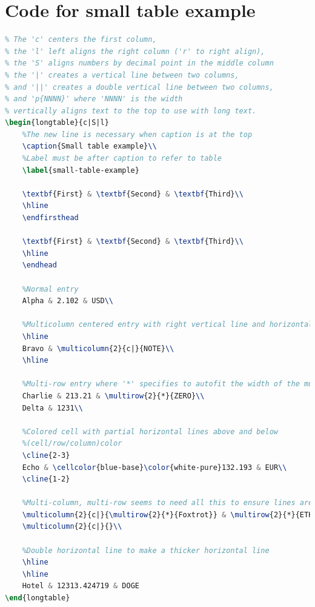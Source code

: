\section{Code for small table example}
\label{code-small-table-example}

\begin{lstlisting}[language=tex]
%The second argument describes how many columns there are.
% The 'c' centers the first column,
% the 'l' left aligns the right column ('r' to right align),
% the 'S' aligns numbers by decimal point in the middle column
% the '|' creates a vertical line between two columns,
% and '||' creates a double vertical line between two columns,
% and 'p{NNNN}' where 'NNNN' is the width 
% vertically aligns text to the top to use with long text.
\begin{longtable}{c|S|l}
    %The new line is necessary when caption is at the top
    \caption{Small table example}\\
    %Label must be after caption to refer to table
    \label{small-table-example}

    \textbf{First} & \textbf{Second} & \textbf{Third}\\
    \hline
    \endfirsthead

    \textbf{First} & \textbf{Second} & \textbf{Third}\\
    \hline
    \endhead

    %Normal entry
    Alpha & 2.102 & USD\\

    %Multicolumn centered entry with right vertical line and horizontal lines
    \hline
    Bravo & \multicolumn{2}{c|}{NOTE}\\
    \hline

    %Multi-row entry where '*' specifies to autofit the width of the multiple rows
    Charlie & 213.21 & \multirow{2}{*}{ZERO}\\
    Delta & 1231\\
    
    %Colored cell with partial horizontal lines above and below
    %(cell/row/column)color 
    \cline{2-3}
    Echo & \cellcolor{blue-base}\color{white-pure}132.193 & EUR\\
    \cline{1-2}

    %Multi-column, multi-row seems to need all this to ensure lines are drawn correctly
    \multicolumn{2}{c|}{\multirow{2}{*}{Foxtrot}} & \multirow{2}{*}{ETH}\\
    \multicolumn{2}{c|}{}\\

    %Double horizontal line to make a thicker horizontal line
    \hline
    \hline
    Hotel & 12313.424719 & DOGE
\end{longtable}
\end{lstlisting}


